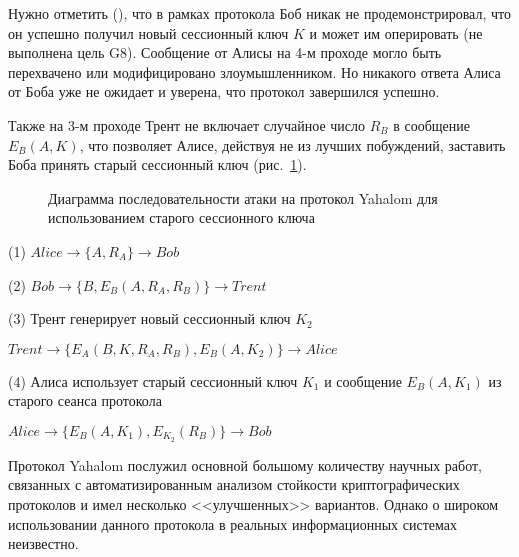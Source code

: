 Нужно отметить (\cite{Zhou:Yu:Pan:Wang:2016}), что в рамках протокола Боб никак не продемонстрировал, что он успешно получил новый сессионный ключ $K$ и может им оперировать (не выполнена цель G8). Сообщение от Алисы на 4-м проходе могло быть перехвачено или модифицировано злоумышленником. Но никакого ответа Алиса от Боба уже не ожидает и уверена, что протокол завершился успешно.

Также на 3-м проходе Трент не включает случайное число $R_B$ в сообщение $E_B(A, K)$, что позволяет Алисе, действуя не из лучших побуждений, заставить Боба принять старый сессионный ключ (рис.~\ref{fig:key_distribution-yahalom-attack}).

\begin{figure}
	\centering
	\begin{sequencediagram}

	\end{sequencediagram}
	\caption{Диаграмма последовательности атаки на протокол Yahalom для использованием старого сессионного ключа\label{fig:key_distribution-yahalom-attack}}
\end{figure}

\begin{protocol}
	\item[(1)] $Alice \to \{ A, R_A \} \to Bob$
	\item[(2)] $Bob \to \{ B, E_B( A, R_A, R_B ) \} \to Trent$
	\item[(3)] Трент генерирует новый сессионный ключ $K_2$
	\item[{}] $Trent \to \{ E_A( B, K, R_A, R_B ), E_B(A, K_2) \} \to Alice$
	\item[(4)] Алиса использует старый сессионный ключ $K_1$ и сообщение $E_B( A, K_1 )$ из старого сеанса протокола
	\item[{}] $Alice \to \{ E_B( A, K_1 ), E_{K_2}( R_B ) \} \to Bob$
\end{protocol}

Протокол Yahalom послужил основной большому количеству научных работ, связанных с автоматизированным анализом стойкости криптографических протоколов и имел несколько <<улучшенных>> вариантов. Однако о широком использовании данного протокола в реальных информационных системах неизвестно.

